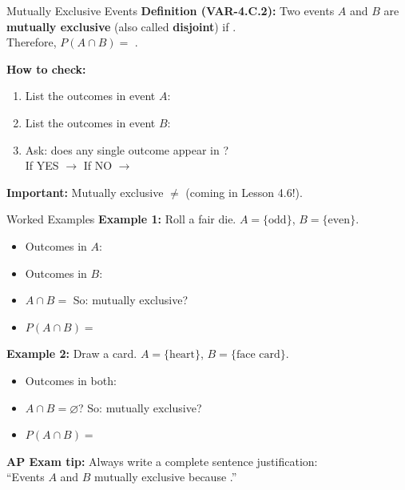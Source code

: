 \documentclass[10pt]{article}
\begin{document}
\begin{notesbox}{Mutually Exclusive Events}
\small
\textbf{Definition (VAR-4.C.2):} Two events $A$ and $B$ are \textbf{mutually exclusive}
(also called \textbf{disjoint}) if .\\[6pt]
Therefore, $P(A \cap B) = $ .

\vspace{10pt}
\textbf{How to check:}
\begin{enumerate}[leftmargin=1.5em, itemsep=4pt]
  \item List the outcomes in event $A$: 
  \item List the outcomes in event $B$: 
  \item Ask: does any single outcome appear in ?\\
        If YES $\to$  \quad If NO $\to$ 
\end{enumerate}

\vspace{10pt}
\textbf{Important:} Mutually exclusive $\neq$  (coming in Lesson 4.6!).
\end{notesbox}

\vspace{0.1in}

\begin{notesbox}{Worked Examples}
\small
\textbf{Example 1:} Roll a fair die. $A = \{\text{odd}\}$, $B = \{\text{even}\}$.
\begin{itemize}[itemsep=3pt]
  \item Outcomes in $A$: 
  \item Outcomes in $B$: 
  \item $A \cap B = $ \ans{$\varnothing$} \quad So: mutually exclusive? 
  \item $P(A \cap B) = $ 
\end{itemize}

\vspace{8pt}
\textbf{Example 2:} Draw a card. $A = \{\text{heart}\}$, $B = \{\text{face card}\}$.
\begin{itemize}[itemsep=3pt]
  \item Outcomes in both: 
  \item $A \cap B = \varnothing$?  \quad So: mutually exclusive? 
  \item $P(A \cap B) = $ 
\end{itemize}

\vspace{8pt}
\textbf{AP Exam tip:} Always write a complete sentence justification:\\[4pt]
``Events $A$ and $B$  mutually exclusive because .''
\end{notesbox}
\end{document}

